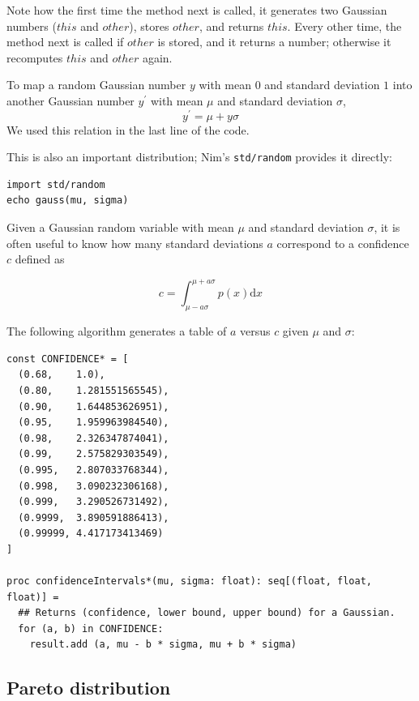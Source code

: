 \documentclass[justified, sixbynine]{tufte-book}
\def\ft{\small\tt}
\theoremstyle{plain}%
\newtheorem * {corollary}{Corollary}
\theoremstyle{definition}
\theoremstyle{remark}
\newtheorem * {remark}{Remark}
\newtheorem * {note}{Note}
\begin{document}
\begin{fullwidth}
Note how the first time the method next is called, it generates two Gaussian
numbers ($this$ and $other$), stores $other$, and returns $this$. Every other
time, the method next is called if $other$ is stored, and it returns a number;
otherwise it recomputes $this$ and $other$ again.

To map a random Gaussian number $y$ with mean $0$ and standard deviation $1$
into another Gaussian number $y^{\prime }$ with mean $\mu $ and standard
deviation $\sigma $,
\begin{equation}
y^{\prime }=\mu +y\sigma
\end{equation}
We used this relation in the last line of the code.

This is also an important distribution; Nim's {\ft std/random} provides it directly:

\begin{lstlisting}
import std/random
echo gauss(mu, sigma)
\end{lstlisting}

Given a Gaussian random variable with mean $\mu$ and standard deviation $\sigma$, it is often useful to know how many standard deviations $a$ correspond to a confidence $c$ defined as

\begin{equation}
c = \int_{\mu-a\sigma}^{\mu+a\sigma} p(x)\textrm{d}x
\end{equation}

The following algorithm generates a table of $a$ versus $c$ given $\mu$ and $\sigma$:


\begin{lstlisting}[caption={in file: {\ft nlib/randomgen.nim}}]
const CONFIDENCE* = [
  (0.68,    1.0),
  (0.80,    1.281551565545),
  (0.90,    1.644853626951),
  (0.95,    1.959963984540),
  (0.98,    2.326347874041),
  (0.99,    2.575829303549),
  (0.995,   2.807033768344),
  (0.998,   3.090232306168),
  (0.999,   3.290526731492),
  (0.9999,  3.890591886413),
  (0.99999, 4.417173413469)
]

proc confidenceIntervals*(mu, sigma: float): seq[(float, float, float)] =
  ## Returns (confidence, lower bound, upper bound) for a Gaussian.
  for (a, b) in CONFIDENCE:
    result.add (a, mu - b * sigma, mu + b * sigma)
\end{lstlisting}

\goodbreak\subsection{Pareto distribution}


\end{fullwidth}
\end{document}
